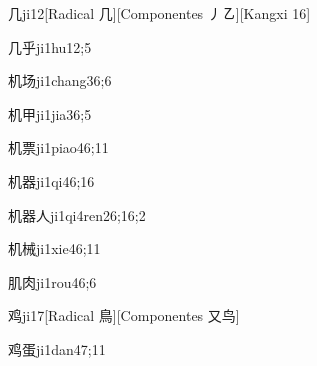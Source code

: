 
\begin{verbete}{几}{ji1}{2}[Radical 几][Componentes 丿㇠][Kangxi 16]
\end{verbete}

\begin{verbete}{几乎}{ji1hu1}{2;5}
\end{verbete}

\begin{verbete}{机场}{ji1chang3}{6;6}
\end{verbete}

\begin{verbete}{机甲}{ji1jia3}{6;5}
\end{verbete}

\begin{verbete}{机票}{ji1piao4}{6;11}
\end{verbete}

\begin{verbete}{机器}{ji1qi4}{6;16}
\end{verbete}

\begin{verbete}{机器人}{ji1qi4ren2}{6;16;2}
\end{verbete}

\begin{verbete}{机械}{ji1xie4}{6;11}
\end{verbete}

\begin{verbete}{肌肉}{ji1rou4}{6;6}
\end{verbete}

\begin{verbete}{鸡}{ji1}{7}[Radical 鳥][Componentes 又鸟]
\end{verbete}

\begin{verbete}{鸡蛋}{ji1dan4}{7;11}
\end{verbete}

